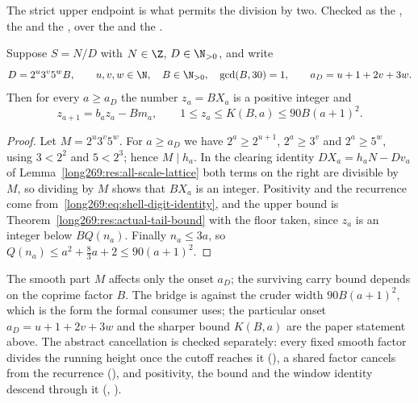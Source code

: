 \documentclass[11pt]{article}
\begin{document}
\noindent The strict upper endpoint is what permits the division by two.
Checked as the
, the
 and the
,
over the
 and the
.

\begin{theorem}
\label{long269:res:actual-cancellation}\label{long269:res:lead-carry-bridge}
\label{long269:res:actual-carry-bound}\label{long269:res:denominator-reduction}
Suppose $S=N/D$ with $N\in\Z$, $D\in\N_{>0}$, and write
\[
 D=2^{u}3^{v}5^{w}B,\qquad u,v,w\in\N,\quad B\in\N_{>0},\quad\gcd(B,30)=1,
 \qquad a_D=u+1+2v+3w .
\]
Then for every $a\ge a_D$ the number $z_a=BX_a$ is a positive integer and
\[
 z_{a+1}=b_az_a-Bm_a,\qquad 1\le z_a\le K(B,a)\le90B(a+1)^{2} .
\]
\end{theorem}

\begin{proof}
Let $M=2^{u}3^{v}5^{w}$.  For $a\ge a_D$ we have $2^{a}\ge2^{u+1}$,
$2^{a}\ge3^{v}$ and $2^{a}\ge5^{w}$, using $3<2^{2}$ and $5<2^{3}$; hence
$M\mid h_a$.  In the clearing identity $DX_a=h_aN-Dv_a$ of
Lemma~\ref{long269:res:all-scale-lattice} both terms on the right are divisible by $M$,
so dividing by $M$ shows that $BX_a$ is an integer.  Positivity and the
recurrence come from~\eqref{long269:eq:shell-digit-identity}, and the upper bound is
Theorem~\ref{long269:res:actual-tail-bound} with the floor taken, since $z_a$ is an
integer below $BQ(n_a)$.  Finally $n_a\le3a$, so
$Q(n_a)\le a^{2}+\tfrac83a+2\le90(a+1)^{2}$.
\end{proof}

\noindent The smooth part $M$ affects only the onset $a_D$; the surviving carry
bound depends on the coprime factor $B$.  The bridge is
against the cruder width $90B(a+1)^{2}$, which is the form the formal consumer
uses; the particular onset $a_D=u+1+2v+3w$ and the sharper bound
$K(B,a)$ are the paper statement above.  The abstract cancellation is checked
separately: every fixed smooth factor divides the running height once the
cutoff reaches it
(),
a shared factor cancels from the recurrence
(),
and positivity, the bound and the window identity descend through it
(,
).
\end{document}
